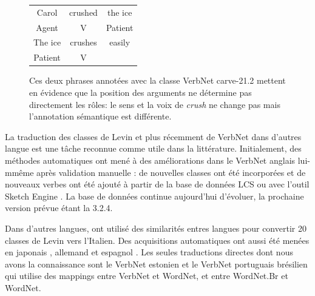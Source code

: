 \begin{figure}[ht]
    \centering
    \begin{tabular}{ccc}
        \toprule
        Carol & crushed   & the ice \\
        Agent & V         & Patient \\
        \midrule
        The ice & crushes & easily  \\
        Patient & V       &         \\
        \bottomrule
    \end{tabular}
    \caption{\label{fig:example_srl}Ces deux phrases annotées avec la classe VerbNet carve-21.2 mettent en évidence que la position des arguments ne détermine pas directement les rôles: le sens et la voix de \textit{crush} ne change pas mais l'annotation sémantique est différente.}
\end{figure}

La traduction des classes de Levin et plus récemment de VerbNet dans d'autres
langue est une tâche reconnue comme utile dans la littérature. Initialement,
des méthodes automatiques ont mené à des améliorations dans le VerbNet anglais
lui-mmême après validation manuelle : de nouvelles classes ont été incorporées
\citep{korhonen2004extended} et de nouveaux verbes ont été ajouté à partir de
la base de données LCS \citep{dorr2001lcs} ou avec l'outil Sketch Engine
\citep{bonial2013expanding}. La base de données continue aujourd'hui d'évoluer,
la prochaine version prévue étant la 3.2.4.

Dans d'autres langues, \cite{merlo2002multilingual} ont utilisé des similarités
entres langues pour convertir 20 classes de Levin vers l'Italien. Des
acquisitions automatiques ont aussi été menées en japonais
\citep{suzuki2009classifying}, allemand \citep{im2006experiments} et espagnol
\citep{ferrer2004towards}. Les seules traductions directes dont nous avons la
connaissance sont le VerbNet estonien \citep{jentson2014verbnet} et le VerbNet
portuguais brésilien \citep{scarton2012towards} qui utilise des mappings entre
VerbNet et WordNet, et entre WordNet.Br et WordNet.


